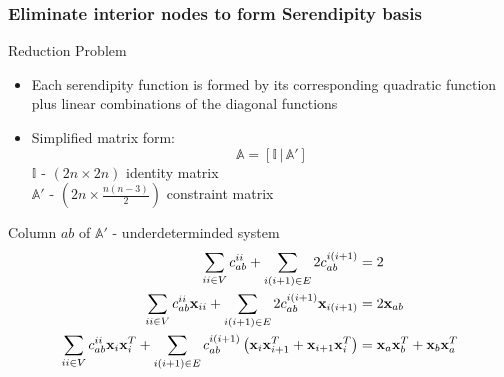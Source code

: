 \documentclass[compress,10pt]{beamer}
\renewcommand{\vec}[1]{\mathbf{#1}}
\begin{document}
\begin{frame}[t]\frametitle{\small Eliminate interior nodes to form Serendipity basis}
{\small
\vspace{-3mm}
\begin{block}{Reduction Problem}
\begin{itemize}
\item Each serendipity function is formed by its corresponding quadratic function plus linear combinations of the diagonal functions
\item Simplified matrix form:
\begin{equation*}
\mathbb{A} = \left[  \mathbb{I} \, | \, \mathbb{A}' \right]
\end{equation*}
$\mathbb{I}$ - $(2n \times 2n)$ identity matrix \\
$\mathbb{A}'$ - $(2n \times \frac{n(n-3)}{2})$ constraint matrix
\end{itemize}
\end{block}
\vspace{-3mm}
{
\begin{block}{Column $ab$ of $\mathbb{A}'$ - underdeterminded system}
\begin{equation*}
\begin{aligned}
\sum\displaylimits_{ii \in V} c_{ab}^{ii} + \sum\displaylimits_{i(i+1) \in E} 2 c_{ab}^{i(i+1)} &= 2 \\
\sum\displaylimits_{ii \in V} c_{ab}^{ii} \vec{x}_{ii} + \sum\displaylimits_{i(i+1) \in E} 2 c_{ab}^{i(i+1)} \vec{x}_{i (i+1)} &= 2 \vec{x}_{ab}\\
\sum\displaylimits_{ii \in V} c_{ab}^{ii} \vec{x}_{i} \vec{x}_{i}^T + \sum\displaylimits_{i(i+1) \in E} c_{ab}^{i(i+1)} \left(  \vec{x}_{i} \vec{x}_{i+1}^T + \vec{x}_{i+1} \vec{x}_{i}^T  \right) &= \vec{x}_{a} \vec{x}_{b}^T + \vec{x}_{b} \vec{x}_{a}^T
\end{aligned}
\end{equation*}
\end{block}
}
}
\end{frame}
\end{document}
